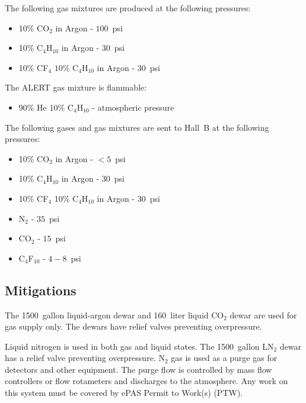 The following gas mixtures are produced at the following pressures:

\begin{itemize}
\item 10\% CO$_2$ in Argon - $100$~psi
\item 10\% C$_4$H$_{10}$ in Argon - $30$~psi
\item 10\% CF$_4$ $10\%$ C$_4$H$_{10}$ in Argon - $30$~psi
\end{itemize}

The ALERT gas mixture is flammable:

\begin{itemize}
\item 90\% He 10\% C$_4$H$_{10}$ - atmospheric pressure
\end{itemize}

The following gases and gas mixtures are sent to Hall~B at the following pressures:

\begin{itemize}
\item 10\% CO$_2$ in Argon - $<5$~psi
\item 10\% C$_4$H$_{10}$ in Argon - $30$~psi
\item 10\% CF$_4$ 10\% C$_4$H$_{10}$ in Argon - $30$~psi
\item N$_2$ - $35$~psi
\item CO$_2$ - $15$~psi
\item C$_4$F$_{10}$ - $4 - 8$~psi
\end{itemize}

\subsection{Mitigations}

The 1500~gallon liquid-argon dewar and 160~liter liquid CO$_2$ dewar are used for gas supply 
only. The dewars have relief valves preventing overpressure.

Liquid nitrogen is used in both gas and liquid states. The 1500~gallon LN$_2$ dewar has a 
relief valve preventing overpressure.  
N$_2$ gas is used as a purge gas for detectors and other equipment. The purge flow is 
controlled by mass flow controllers or flow rotameters and discharges to the atmosphere.
Any work on this system must be covered by ePAS Permit to Work(s) (PTW).


